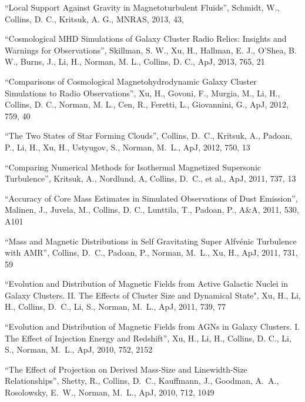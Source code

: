\medskip
\noindent
``Local Support Against Gravity in Magnetoturbulent Fluids'',
Schmidt, W., Collins, D. C., Kritsuk, A. G.,
MNRAS, 2013, 43, 


\medskip
\noindent
``Cosmological MHD Simulations of Galaxy Cluster Radio Relics: Insights and Warnings for Observations'', 
Skillman, S. W., Xu, H., Hallman, E. J., O’Shea, B. W., Burns, J., Li, H., Norman, M. L., Collins, D. C.,
ApJ, 2013, 765, 21

\medskip
\noindent
``Comparisons of Cosmological Magnetohydrodynamic Galaxy Cluster Simulations to Radio Observations'', 
Xu, H., Govoni, F., Murgia, M., Li, H., Collins, D. C., Norman, M. L., Cen, R., Feretti, L., Giovannini, G.,
ApJ, 2012, 759, 40

\medskip
\noindent
``The Two States of Star Forming Clouds'', 
Collins, D.~C., Kritsuk, A., Padoan, P., Li, H., Xu, H., Ustyugov, S., Norman, M.~L.,
ApJ, 2012, 750, 13


\medskip
\noindent
``Comparing Numerical Methods for Isothermal Magnetized Supersonic Turbulence'', 
Kritsuk, A., Nordlund, A, Collins, D.~C., et al.,
ApJ, 2011, 737, 13

\medskip
\noindent
``Accuracy of Core Mass Estimates in Simulated Observations of Dust Emission'', 
Malinen, J., Juvela, M., Collins, D. C., Lunttila, T., Padoan, P.,
A\&A, 2011, 530, A101

\medskip
\noindent
``Mass and Magnetic Distributions in Self Gravitating Super Alfv\' enic Turbulence with AMR'', 
Collins, D.~C., Padoan, P., Norman, M.~L., Xu, H.,
ApJ, 2011, 731, 59

\medskip
\noindent
``Evolution and Distribution of Magnetic Fields from Active Galactic Nuclei in Galaxy Clusters. II. The Effects of Cluster Size and Dynamical State",
Xu, H., Li, H., Collins, D.~C., Li, S., Norman, M.~L.,
ApJ, 2011, 739, 77

\medskip
\noindent
``Evolution and Distribution of Magnetic Fields from AGNs in Galaxy Clusters.  I.  The Effect of Injection Energy and Redshift'', 
Xu, H., Li, H., Collins, D. C., Li, S., Norman, M.~L.,
ApJ, 2010, 752, 2152

\medskip
\noindent
``The Effect of Projection on Derived Mass-Size and Linewidth-Size Relationships'', 
Shetty, R., Collins, D.~C.,  Kauffmann, J.,  Goodman, A.~A.,  Rosolowsky, E.~W.,  Norman, M.~L., 
ApJ, 2010, 712, 1049

